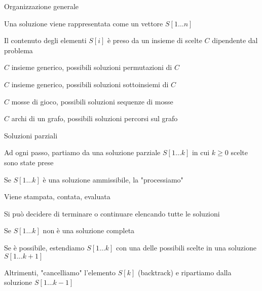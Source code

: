 \begin{frame}{Organizzazione generale}
    
\begin{myboxtitle}
\BI
\item Una soluzione viene rappresentata come un \alert{vettore $S[1 \ldots n]$} 
\item  Il contenuto degli elementi $S[i]$ è preso da un \alert{insieme di scelte $C$} dipendente dal problema
\EI
\end{myboxtitle}

\begin{myboxtitle}[Esempi]
\BI
\item $C$ insieme generico, possibili soluzioni \alert{permutazioni} di $C$
\item $C$ insieme generico, possibili soluzioni \alert{sottoinsiemi} di $C$
\item $C$ mosse di gioco, possibili soluzioni \alert{sequenze di mosse}
\item $C$ archi di un grafo, possibili soluzioni \alert{percorsi sul grafo}
\EI
\end{myboxtitle}

\end{frame}

\begin{frame}{Soluzioni parziali}

\BIL
\item Ad ogni passo, partiamo da una soluzione parziale $S[1 \ldots k]$ in cui
$k \geq 0$ scelte sono state prese
\item Se $S[1 \ldots k]$ è una soluzione ammissibile, la "processiamo" 
  \BI
	\item Viene stampata, contata, evaluata
	\item Si può decidere di terminare o continuare elencando tutte le soluzioni
	\EI
\item Se $S[1 \ldots k]$ non è una soluzione completa
  \BI
  \item Se è possibile, estendiamo $S[1 \ldots k]$ con una delle possibili 
	  scelte in una soluzione $S[1 \ldots k+1]$
	\item Altrimenti, "cancelliamo" l'elemento $S[k]$ (backtrack) 
	e ripartiamo dalla soluzione $S[1 \ldots k-1]$
  \EI
\EIL

\end{frame}

